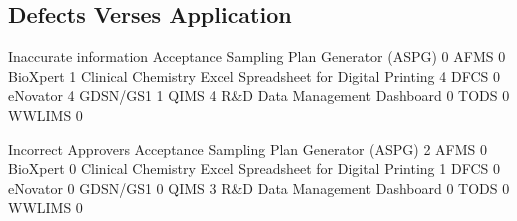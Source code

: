 \documentclass{article}
\begin{document}
\subsection{Defects Verses Application}

\begin{Schunk}
\begin{Soutput}
                                                            Inaccurate information
  Acceptance Sampling Plan Generator (ASPG)                                      0
  AFMS                                                                           0
  BioXpert                                                                       1
  Clinical Chemistry Excel Spreadsheet for Digital Printing                      4
  DFCS                                                                           0
  eNovator                                                                       4
  GDSN/GS1                                                                       1
  QIMS                                                                           4
  R&D Data Management Dashboard                                                  0
  TODS                                                                           0
  WWLIMS                                                                         0
                                                           
                                                            Incorrect Approvers
  Acceptance Sampling Plan Generator (ASPG)                                   2
  AFMS                                                                        0
  BioXpert                                                                    0
  Clinical Chemistry Excel Spreadsheet for Digital Printing                   1
  DFCS                                                                        0
  eNovator                                                                    0
  GDSN/GS1                                                                    0
  QIMS                                                                        3
  R&D Data Management Dashboard                                               0
  TODS                                                                        0
  WWLIMS                                                                      0
                                                           

\end{Soutput}
\end{Schunk}
\end{document}
